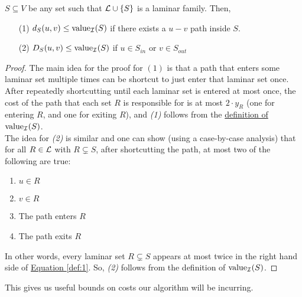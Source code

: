 	\begin{lemma}\label{lemm:2:D-val} 
		$S\subseteq V$ be any set such that $\mathcal{L} \cup \{S\}$ is a laminar family. 
		Then,
		\begin{enumerate}
			\item[(1)] $d_S(u,v)\leq \textup{value}_{\mathcal{I}}(S)$ if there exists a $u-v$ path inside $S$.
			\item[(2)] $D_S(u,v)\leq \textup{value}_{\mathcal{I}}(S)$ if $u\in S_{in}$ or $v\in S_{out}$
		\end{enumerate}
	\end{lemma}
	\begin{proof}
		The main idea for the proof for $(1)$ is that a path that enters some laminar set multiple times can be shortcut to just enter that laminar set once. 
		After repeatedly shortcutting until each laminar set is entered at most once, the cost of the path that each set $R$ is responsible for is at most $2\cdot y_R$ (one for entering $R$, and one for exiting $R$), and \textit{(1)} follows from the \hyperref[def:value]{definition of $\textup{value}_{\mathcal{I}}(S)$}.\\
		The idea for \textit{(2)} is similar and one can show (using a case-by-case analysis) that for all $R\in \mathcal{L}$ with $R\subsetneq S$, after shortcutting the path, at most two of the following are true:
		\begin{enumerate}
			\item $u\in R$
			\item $v\in R$
			\item The path enters $R$
			\item The path exits $R$
		\end{enumerate}
		In other words, every laminar set $R\subsetneq S$ appears at most twice in the right hand side of \hyperref[def:1]{Equation \ref{def:1}}. So, \textit{(2)} follows from the definition of $\textup{value}_{\mathcal{I}}(S)$.
	\end{proof}
	
	This gives us useful bounds on costs our algorithm will be incurring.

